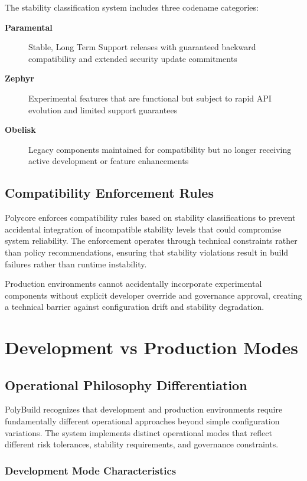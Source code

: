 The stability classification system includes three codename categories:

\begin{description}
\item[\textbf{Paramental}] Stable, Long Term Support releases with guaranteed backward compatibility and extended security update commitments
\item[\textbf{Zephyr}] Experimental features that are functional but subject to rapid API evolution and limited support guarantees
\item[\textbf{Obelisk}] Legacy components maintained for compatibility but no longer receiving active development or feature enhancements
\end{description}

\subsection{Compatibility Enforcement Rules}

Polycore enforces compatibility rules based on stability classifications to prevent accidental integration of incompatible stability levels that could compromise system reliability. The enforcement operates through technical constraints rather than policy recommendations, ensuring that stability violations result in build failures rather than runtime instability.

Production environments cannot accidentally incorporate experimental components without explicit developer override and governance approval, creating a technical barrier against configuration drift and stability degradation.

\section{Development vs Production Modes}

\subsection{Operational Philosophy Differentiation}

PolyBuild recognizes that development and production environments require fundamentally different operational approaches beyond simple configuration variations. The system implements distinct operational modes that reflect different risk tolerances, stability requirements, and governance constraints.

\subsubsection{Development Mode Characteristics}

